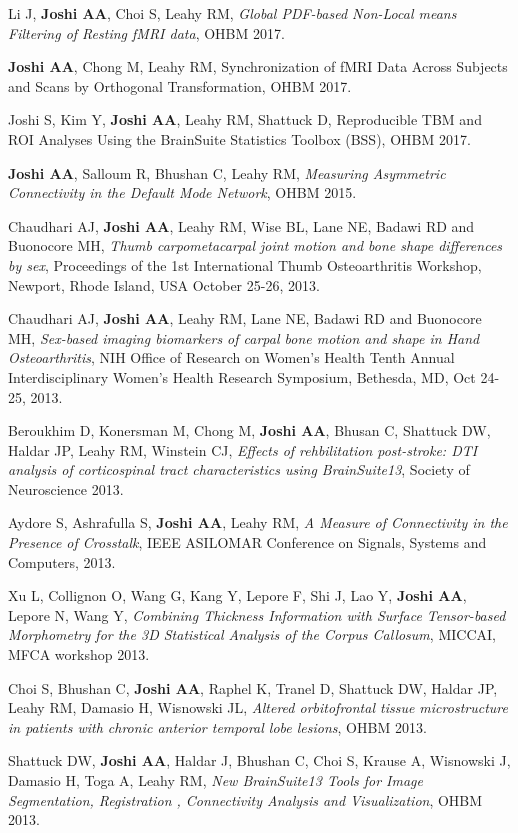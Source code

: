 \documentclass[overlapped,line,letterpaper]{res}
\begin{document}
\begin{resume}
Li J, \textbf{Joshi AA}, Choi S, Leahy RM, \textit{Global PDF-based Non-Local means Filtering of Resting fMRI data}, OHBM 2017.

\textbf{Joshi AA}, Chong M, Leahy RM, Synchronization of fMRI Data Across Subjects and Scans by Orthogonal Transformation, OHBM 2017.

Joshi S, Kim Y, \textbf{Joshi AA}, Leahy RM,  Shattuck D, Reproducible TBM and ROI Analyses Using the BrainSuite Statistics Toolbox (BSS), OHBM 2017.

\textbf{Joshi AA}, Salloum R, Bhushan C, Leahy RM, \textit{Measuring Asymmetric Connectivity in the Default Mode Network}, OHBM 2015.

Chaudhari AJ, \textbf{Joshi AA}, Leahy RM, Wise BL, Lane NE, Badawi RD and Buonocore MH, \textit{Thumb carpometacarpal joint motion and bone shape differences by sex}, Proceedings of the 1st International Thumb Osteoarthritis Workshop, Newport, Rhode Island, USA October 25-26, 2013.

Chaudhari AJ, \textbf{Joshi AA}, Leahy RM, Lane NE, Badawi RD and Buonocore MH, \textit{Sex-based imaging biomarkers of carpal bone motion and shape in Hand Osteoarthritis}, NIH Office of Research on Women's Health Tenth Annual Interdisciplinary Women's Health Research Symposium, Bethesda, MD, Oct 24-25, 2013.

Beroukhim D, Konersman M, Chong M, \textbf{Joshi AA}, Bhusan C, Shattuck DW, Haldar JP, Leahy RM, Winstein CJ, \textit{Effects of rehbilitation post-stroke: DTI analysis of corticospinal tract characteristics using BrainSuite13}, Society of Neuroscience 2013.

Aydore S, Ashrafulla S, \textbf{Joshi AA}, Leahy RM, \textit{A Measure of Connectivity in the Presence of Crosstalk}, IEEE ASILOMAR Conference on Signals, Systems and Computers, 2013.

Xu L, Collignon O, Wang G, Kang Y, Lepore F, Shi J, Lao Y, \textbf{Joshi AA}, Lepore N, Wang Y, \textit{Combining Thickness Information with Surface Tensor-based Morphometry for the 3D Statistical Analysis of the Corpus Callosum}, MICCAI, MFCA workshop 2013.

Choi S, Bhushan C, \textbf{Joshi AA}, Raphel K, Tranel D, Shattuck DW, Haldar JP, Leahy RM, Damasio H, Wisnowski JL, \textit{Altered orbitofrontal tissue microstructure in patients with chronic anterior temporal lobe lesions}, OHBM 2013.

Shattuck DW, \textbf{Joshi AA}, Haldar J, Bhushan C, Choi S, Krause A, Wisnowski J, Damasio H, Toga A, Leahy RM, \textit{New BrainSuite13 Tools for Image Segmentation, Registration , Connectivity Analysis and Visualization}, OHBM 2013.


\end{resume}
\end{document}
